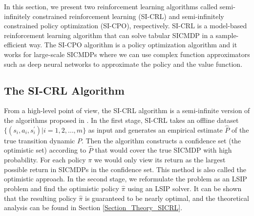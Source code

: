 In this section, we present two reinforcement learning algorithms called semi-infinitely constrained reinforcement learning (SI-CRL) and semi-infinitely constrained policy optimization (SI-CPO), respectively.
SI-CRL is a model-based reinforcement learning algorithm that can solve tabular SICMDP in a sample-efficient way.
The SI-CPO algorithm is a policy optimization algorithm and it works for large-scale SICMDPs where we can use complex function approximators such as deep neural networks to approximate the policy and the value function.
\subsection{The SI-CRL Algorithm}\label{Section_SICRL}
From a high-level point of view, the SI-CRL algorithm is a semi-infinite version of the algorithms proposed in \cite{ijcai2021-347, efroni2020explorationexploitation}.
In the first stage, SI-CRL takes an offline dataset $\{(s_i, a_i, s_i^\prime)|i=1, 2, \ldots, m\}$ as input and generates an empirical estimate $\widehat P$ of the true transition dynamic $P$.
Then the algorithm constructs a confidence set (the optimistic set) according to $\widehat P$ that would cover the true SICMDP with high probability.
For each policy $\pi$ we would only view its return as the largest possible return in SICMDPs in the confidence set.
This method is also called the optimistic approach.
In the second stage, we reformulate the problem as an LSIP problem and find the optimistic policy $\hat \pi$ using an LSIP solver.
It can be shown that the resulting policy $\hat\pi$ is guaranteed to be nearly optimal, and the theoretical analysis can be found in Section \ref{Section_Theory_SICRL}.

